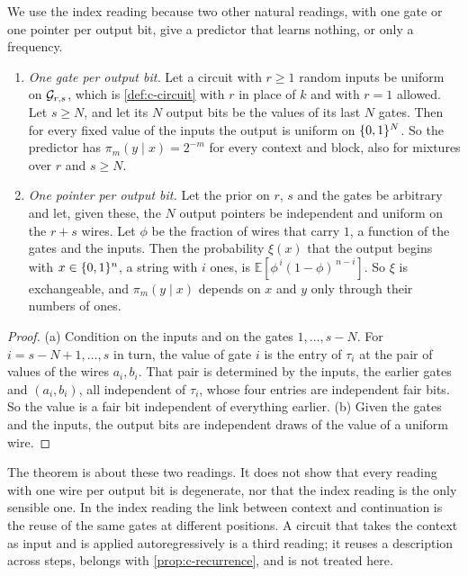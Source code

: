 We use the index reading because two other natural readings, with one gate or one pointer per output bit, give
a predictor that learns nothing, or only a frequency.

\begin{theorem}\label{thm:c-readings}
\begin{enumerate}[label=(\alph*),leftmargin=2em,itemsep=2pt,topsep=2pt]
\item \emph{One gate per output bit.} Let a circuit with $r\ge1$ random inputs be uniform on $\mathcal G_{r,s}$,
which is \cref{def:c-circuit} with $r$ in place of $k$ and with $r=1$ allowed. Let $s\ge N$, and let its $N$
output bits be the values of its last $N$ gates. Then for every fixed value of the inputs the output is
uniform on $\{0,1\}^N$. So the predictor has $\pi_m(y\mid x)=2^{-m}$ for every context and block, also for mixtures
over $r$ and $s\ge N$.
\item \emph{One pointer per output bit.} Let the prior on $r$, $s$ and the gates be arbitrary and let, given
these, the $N$ output pointers be independent and uniform on the $r+s$ wires. Let $\phi$ be the fraction of
wires that carry $1$, a function of the gates and the inputs. Then the probability $\xi(x)$ that the output
begins with $x\in\{0,1\}^n$, a string with $i$ ones, is $\mathbb E[\phi^{\,i}(1-\phi)^{\,n-i}]$. So $\xi$ is
exchangeable, and $\pi_m(y\mid x)$ depends on $x$ and $y$ only through their numbers of ones.
\end{enumerate}
\end{theorem}
\begin{proof}
(a) Condition on the inputs and on the gates $1,\dots,s-N$. For $i=s-N+1,\dots,s$ in turn, the value of gate
$i$ is the entry of $\tau_i$ at the pair of values of the wires $a_i,b_i$. That pair is determined by the
inputs, the earlier gates and $(a_i,b_i)$, all independent of $\tau_i$, whose four entries are independent
fair bits. So the value is a fair bit independent of everything earlier. (b) Given the gates and the inputs,
the output bits are independent draws of the value of a uniform wire.
\end{proof}

The theorem is about these two readings. It does not show that every reading with one wire per output bit is
degenerate, nor that the index reading is the only sensible one. In the index reading the link between context
and continuation is the reuse of the same gates at different positions. A circuit that takes the context as
input and is applied autoregressively is a third reading; it reuses a description across steps, belongs with
\cref{prop:c-recurrence}, and is not treated here.

